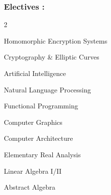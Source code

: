 \documentclass{article}
\newenvironment{mylist}[2]{
  \subsubsection*{#1}
  \begin{multicols}{#2}
  \small
  \begin{list}{}{}
   \setlength{\topsep}{0pt}
   \setlength{\itemsep}{1pt}
   \setlength{\parskip}{0pt}
   \setlength{\parsep}{0pt}}{\end{list}\end{multicols}\normalsize}
\begin{document}
\begin{comment}
\begin{mylist}{Courses :}{2}
\item Unix Software Development
\item Windows Software Development
\item Analysis of Algorithms
\item Linear/Non-Linear Data Structures
\item Formal Languages/Automata
\item Programming Languages
\item Concurrent Programming
\item Computer Organization I/II
\end{mylist}
\end{comment}

\begin{mylist}{Electives :}{2}
\item Homomorphic Encryption Systems
\item Cryptography \& Elliptic Curves
\item Artificial Intelligence
\item Natural Language Processing
\item Functional Programming
\item Computer Graphics
\item Computer Architecture
\item Elementary Real Analysis
\item Linear Algebra I/II
\item Abstract Algebra
\end{mylist}
\end{document}
